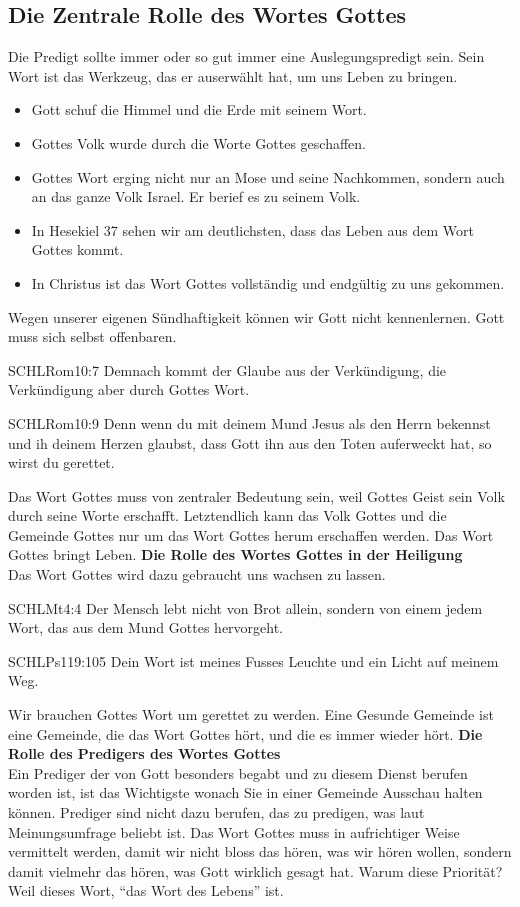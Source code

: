 \documentclass{../../inc/mybib}
\begin{document}
\subsection*{Die Zentrale Rolle des Wortes Gottes}
Die Predigt sollte immer oder so gut immer eine Auslegungspredigt sein. Sein Wort ist das Werkzeug, das er auserwählt hat, um uns Leben zu bringen.
\begin{itemize}
    \item Gott schuf die Himmel und die Erde mit seinem Wort.
    \item Gottes Volk wurde durch die Worte Gottes geschaffen.
    \item Gottes Wort erging nicht nur an Mose und seine Nachkommen, sondern auch an das ganze Volk Israel. Er berief es zu seinem Volk.
    \item In Hesekiel 37 sehen wir am deutlichsten, dass das Leben aus dem Wort Gottes kommt.
    \item In Christus ist das Wort Gottes vollständig und endgültig zu uns gekommen.
\end{itemize}
Wegen unserer eigenen Sündhaftigkeit können wir Gott nicht kennenlernen. Gott muss sich selbst offenbaren.
\begin{bibelbox}{SCHL}{Rom}{10:7}
    Demnach kommt der Glaube aus der Verkündigung, die Verkündigung aber durch Gottes Wort.
\end{bibelbox}
\begin{bibelbox}{SCHL}{Rom}{10:9}
    Denn wenn du mit deinem Mund Jesus als den Herrn bekennst und ih deinem Herzen glaubst, dass Gott ihn aus den Toten auferweckt hat, so wirst du gerettet.
\end{bibelbox}
Das Wort Gottes muss von zentraler Bedeutung sein, weil Gottes Geist sein Volk durch seine Worte erschafft. Letztendlich kann das Volk Gottes und die Gemeinde Gottes nur um das Wort Gottes herum erschaffen werden. Das Wort Gottes bringt Leben.
\textbf{Die Rolle des Wortes Gottes in der Heiligung}\\
Das Wort Gottes wird dazu gebraucht uns wachsen zu lassen.
\begin{bibelbox}{SCHL}{Mt}{4:4}
    Der Mensch lebt nicht von Brot allein, sondern von einem jedem Wort, das aus dem Mund Gottes hervorgeht.
\end{bibelbox}
\begin{bibelbox}{SCHL}{Ps}{119:105}
    Dein Wort ist meines Fusses Leuchte und ein Licht auf meinem Weg.
\end{bibelbox}
Wir brauchen Gottes Wort um gerettet zu werden. Eine Gesunde Gemeinde ist eine Gemeinde, die das Wort Gottes hört, und die es immer wieder hört.
\textbf{Die Rolle des Predigers des Wortes Gottes}\\
Ein Prediger der von Gott besonders begabt und zu diesem Dienst berufen worden ist, ist das Wichtigste wonach Sie in einer Gemeinde Ausschau halten können. Prediger sind nicht dazu berufen, das zu predigen, was laut Meinungsumfrage beliebt ist. Das Wort Gottes muss in aufrichtiger Weise vermittelt werden, damit wir nicht bloss das hören, was wir hören wollen, sondern damit vielmehr das hören, was Gott wirklich gesagt hat. Warum diese Priorität? Weil dieses Wort, \enquote{das Wort des Lebens} ist.
\end{document}
